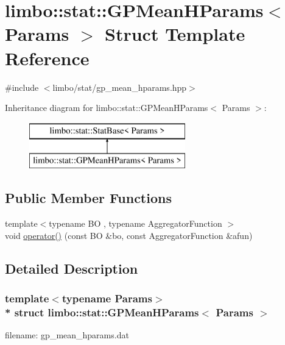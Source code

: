 \hypertarget{structlimbo_1_1stat_1_1_g_p_mean_h_params}{}\section{limbo\+:\+:stat\+:\+:G\+P\+Mean\+H\+Params$<$ Params $>$ Struct Template Reference}
\label{structlimbo_1_1stat_1_1_g_p_mean_h_params}


{\ttfamily \#include $<$limbo/stat/gp\+\_\+mean\+\_\+hparams.\+hpp$>$}

Inheritance diagram for limbo\+:\+:stat\+:\+:G\+P\+Mean\+H\+Params$<$ Params $>$\+:\begin{figure}[H]
\begin{center}
\leavevmode
\includegraphics[height=2.000000cm]{structlimbo_1_1stat_1_1_g_p_mean_h_params}
\end{center}
\end{figure}
\subsection*{Public Member Functions}
\begin{DoxyCompactItemize}
\item 
{\footnotesize template$<$typename BO , typename Aggregator\+Function $>$ }\\void \hyperlink{structlimbo_1_1stat_1_1_g_p_mean_h_params_a668c9a82a1ae88273a44f48a4b6f4612}{operator()} (const BO \&bo, const Aggregator\+Function \&afun)
\end{DoxyCompactItemize}


\subsection{Detailed Description}
\subsubsection*{template$<$typename Params$>$\\*
struct limbo\+::stat\+::\+G\+P\+Mean\+H\+Params$<$ Params $>$}

filename\+: {\ttfamily gp\+\_\+mean\+\_\+hparams.\+dat} 

